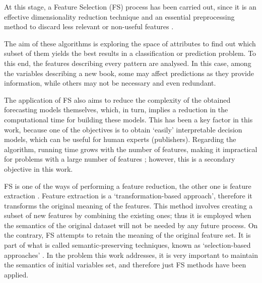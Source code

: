 \documentclass[a4paper,10pt,twocolumn,preprint,3p]{elsarticle}
\begin{document}
At this stage, a Feature Selection (FS) process has been carried out, 
since it is an effective dimensionality reduction technique and an essential 
preprocessing method to discard less relevant or non-useful features 
\cite{Krishnapuram2004,Chen2011_FS_PTS}.

The aim of these algorithms is exploring the space of attributes to find out 
which subset of them yields the best results in a classification or prediction 
problem. To this end, the features describing every pattern are analysed. 
In this case, among the variables describing a new book, some may affect 
predictions as they provide information, while others may not be necessary 
and even redundant.

The application of FS also aims to reduce the complexity of the obtained 
forecasting models themselves, which, in turn, implies a reduction in the 
computational time for building these models. This has been a key 
factor in this work, because one of the objectives is to obtain `easily' 
interpretable decision models, which can be useful for human experts (publishers).
Regarding the algorithm, running time grows with the number of
features, making it impractical for problems with a large number of features 
\cite{Selvakuberan2008}; however, this is a secondary objective in this work.




FS is one of the ways of performing a feature reduction, the other one is 
feature extraction \cite{kittler1986feature}. 
Feature extraction is a `transformation-based approach', therefore
it transforms the original meaning of the features. This method
involves creating a subset of new features by combining the
existing ones; thus it is employed when the semantics of the
original dataset will not be needed by any future process. On the
contrary, FS attempts to retain the meaning of the
original feature set. It is part of what is called semantic-preserving
techniques, known as `selection-based approaches' \cite{liu1998feature}. 
In the problem this work addresses, it is very important to maintain the 
semantics of initial variables set, and therefore just FS methods 
have been applied. 
\end{document}
